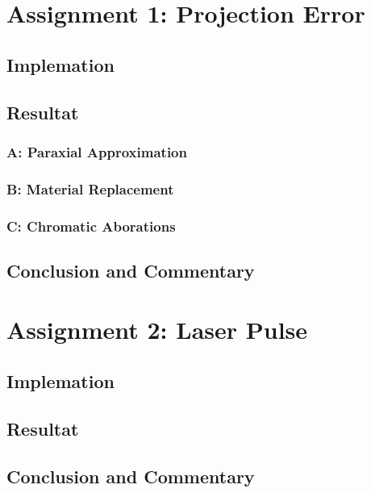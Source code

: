 \documentclass[12pt]{article}
\begin{document}
\section{Assignment 1: Projection Error}

\subsection{Implemation}



\subsection{Resultat}

\subsubsection{A: Paraxial Approximation}

\subsubsection{B: Material Replacement}

\subsubsection{C: Chromatic Aborations}

\subsection{Conclusion and Commentary}


\section{Assignment 2: Laser Pulse}

\subsection{Implemation}



\subsection{Resultat}

\subsection{Conclusion and Commentary}
\end{document}
